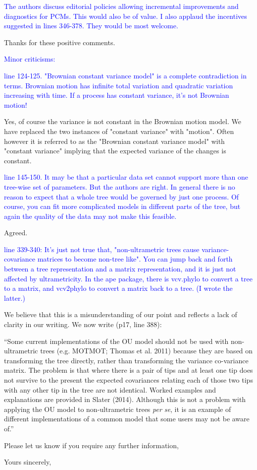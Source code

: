 \documentclass[12pt]{letter}
\begin{document}
\begin{letter}{}
\textcolor{blue}{The authors discuss editorial policies allowing incremental improvements and diagnostics for PCMs. This would also be of value. I also applaud the incentives suggested in lines 346-378. They would be most welcome.}

Thanks for these positive comments. 

\textcolor{blue}{Minor criticisms:}

\textcolor{blue}{line 124-125. "Brownian constant variance model" is a complete contradiction in terms. Brownian motion has infinite total variation and quadratic variation increasing with time. If a process has constant variance, it's not Brownian motion!}

Yes, of course the variance is not constant in the Brownian motion model. We have replaced the two instances of "constant variance" with "motion". Often however it is referred to as the "Brownian constant variance model" with "constant variance" implying that the expected variance of the changes is constant.

\textcolor{blue}{line 145-150. It may be that a particular data set cannot support more than one tree-wise set of parameters. But the authors are right. In general there is no reason to expect that a whole tree would be governed by just one process. Of course, you can fit more complicated models in different parts of the tree, but again the quality of the data may not make this feasible.}

Agreed.

\textcolor{blue}{line 339-340: It's just not true that, "non-ultrametric trees cause variance-covariance matrices to become non-tree like". You can jump back and forth between a tree representation and a matrix representation, and it is just not affected by ultrametricity. In the ape package, there is vcv.phylo to convert a tree to a matrix, and vcv2phylo to convert a matrix back to a tree. (I wrote the latter.)}

We believe that this is a misunderstanding of our point and reflects a lack of clarity in our writing. We now write (p17, line 388): 

``Some current implementations of the OU model should not be used with non-ultrametric trees (e.g. MOTMOT; Thomas et al. 2011) because they are based on transforming the tree directly, rather than transforming the variance co-variance matrix. The problem is that where there is a pair of tips and at least one tip does not survive to the present the expected covariances relating each of those two tips with any other tip in the tree are not identical. Worked examples and explanations are provided in Slater (2014). Although this is not a problem with applying the OU model to non-ultrametric trees \textit{per se}, it is an example of different implementations of a common model that some users may not be aware of.''

Please let us know if you require any further information,

\closing{Yours sincerely,}

\end{letter}
\end{document}
